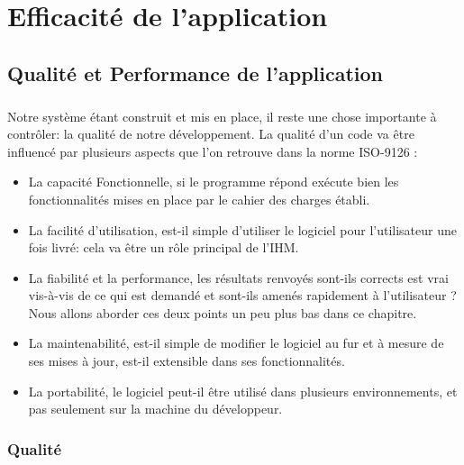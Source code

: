 \documentclass[a4paper, 12pt]{book}
\begin{document}
\chapter{Efficacité de l'application}
\newpage
\section{Qualité et Performance de l'application}
\paragraph{}

% 
% 

\paragraph{}
Notre système étant construit et mis en place, il reste une chose importante à contrôler: la qualité de notre développement. La qualité d'un code va être influencé par plusieurs aspects que l'on retrouve dans la norme ISO-9126 :
\begin{itemize}
\item
La capacité Fonctionnelle, si le programme répond exécute bien les fonctionnalités mises en place par le cahier des charges établi.
\item
La facilité d'utilisation, est-il simple d'utiliser le logiciel pour l'utilisateur une fois livré: cela va être un rôle principal de l'IHM.
\item
La fiabilité et la performance, les résultats renvoyés sont-ils corrects est vrai vis-à-vis de ce qui est demandé et sont-ils amenés rapidement à l'utilisateur ? Nous allons aborder ces deux points un peu plus bas dans ce chapitre.
\item 
La maintenabilité, est-il simple de modifier le logiciel au fur et à mesure de ses mises à jour, est-il extensible dans ses fonctionnalités.
\item
La portabilité, le logiciel peut-il être utilisé dans plusieurs environnements, et pas seulement sur la machine du développeur.
\end{itemize}

\subsection{Qualité}
\end{document}
